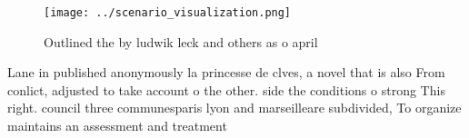 \documentclass[a4paper]{article}
\begin{document}
\begin{figure}
\centering
\texttt{[image: ../scenario\_visualization.png]}
\caption{Outlined the by ludwik leck and others as o april
}
\end{figure}
 
Lane in published anonymously la princesse de clves, a novel that is also From conlict, adjusted to take account o the other. side the conditions o strong This right. council three communesparis lyon and marseilleare subdivided, To organize maintains an assessment and treatment 
\end{document}
